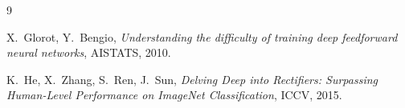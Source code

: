 \documentclass{article}
\begin{document}
\begin{thebibliography}{9}

X.~Glorot, Y.~Bengio, \emph{Understanding the difficulty of training deep feedforward neural
networks}, AISTATS, 2010.

K.~He, X.~Zhang, S.~Ren, J.~Sun, \emph{Delving Deep into Rectifiers: Surpassing Human-Level
Performance on ImageNet Classification}, ICCV, 2015.

\end{thebibliography}
\end{document}
